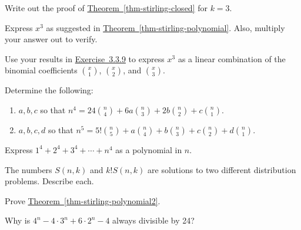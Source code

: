 \documentclass[10pt,]{book}
\theoremstyle{plain}
\theoremstyle{definition}
\theoremstyle{definition}
\theoremstyle{definition}
\theoremstyle{definition}
\numberwithin{equation}{chapter}
\begin{document}
\begin{divisionexercise}{8}\hypertarget{exercise-107}{}
\hypertarget{p-1096}{}%
Write out the proof of \hyperref[thm-stirling-closed]{Theorem~\ref{thm-stirling-closed}} for \(k=3\).%
\end{divisionexercise}%
\begin{divisionexercise}{9}\hypertarget{ex-stirling-cubic}{}
\hypertarget{p-1097}{}%
Express \(x^3\) as suggested in \hyperref[thm-stirling-polynomial]{Theorem~\ref{thm-stirling-polynomial}}.  Also, multiply your answer out to verify.%
\end{divisionexercise}%
\begin{divisionexercise}{10}\hypertarget{exercise-109}{}
\hypertarget{p-1098}{}%
Use your results in \hyperlink{ex-stirling-cubic}{Exercise~3.3.9} to express \(x^3\) as a linear combination of the binomial coefficients \(\binom{x}{1}\), \(\binom{x}{2}\), and \(\binom{x}{3}\).%
\end{divisionexercise}%
\begin{divisionexercise}{11}\hypertarget{exercise-110}{}
\hypertarget{p-1099}{}%
Determine the following: \leavevmode%
\begin{enumerate}[label=(\alph*)]
\item\hypertarget{li-223}{}\hypertarget{p-1100}{}%
\(a, b, c\) so that \(n^4 = 24\binom{n}{4} + 6a\binom{n}{3}+2b\binom{n}{2} + c \binom{n}{1}\).%
\item\hypertarget{li-224}{}\hypertarget{p-1101}{}%
\(a, b, c, d\) so that \(n^5 = 5!\binom{n}{5} + a\binom{n}{4} + b\binom{n}{3} + c \binom{n}{2} + d \binom{n}{1}\).%
\end{enumerate}
%
\end{divisionexercise}%
\begin{divisionexercise}{12}\hypertarget{exercise-111}{}
\hypertarget{p-1102}{}%
Express \(1^4 + 2^4 + 3^4 + \cdots + n^4\) as a polynomial in \(n\).%
\end{divisionexercise}%
\begin{divisionexercise}{13}\hypertarget{exercise-112}{}
\hypertarget{p-1103}{}%
The numbers \(S(n,k)\) and \(k!S(n,k)\) are solutions to two different distribution problems.  Describe each.%
\end{divisionexercise}%
\begin{divisionexercise}{14}\hypertarget{exercise-113}{}
\hypertarget{p-1104}{}%
Prove \hyperref[thm-stirling-polynomial2]{Theorem~\ref{thm-stirling-polynomial2}}.%
\end{divisionexercise}%
\begin{divisionexercise}{15}\hypertarget{exercise-114}{}
\hypertarget{p-1105}{}%
Why is \(4^n - 4\cdot 3^n + 6\cdot 2^n - 4\) always divisible by 24?%
\end{divisionexercise}%
\typeout{************************************************}
\typeout{************************************************}
\end{document}
